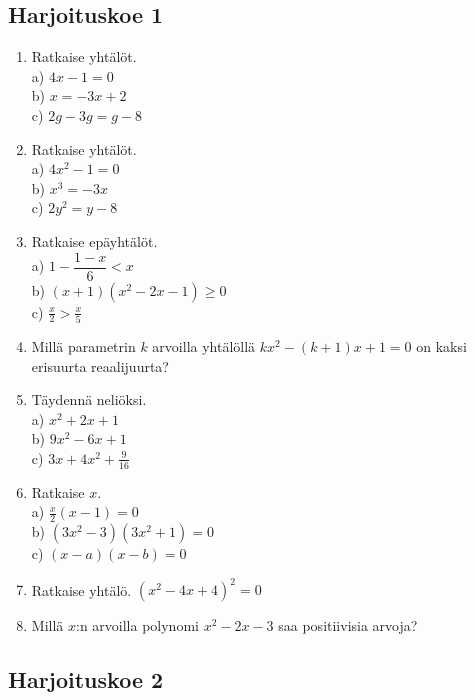 
\subsection*{Harjoituskoe 1}

\begin{enumerate}
\item Ratkaise yhtälöt.\\ a) $4x-1=0$\\ b) $x=-3x+2$\\ c) $2g-3g=g-8$
\item Ratkaise yhtälöt.\\ a) $4x^2-1=0$\\ b) $x^3=-3x$\\ c) $2y^2=y-8$
\item Ratkaise epäyhtälöt.\\ a) $1-\dfrac{1-x}{6}<x$\\ b) $(x+1)(x^2-2x-1)\geq0$\\ c) $\frac{x}{2}>\frac{x}{5}$
\item Millä parametrin $k$ arvoilla yhtälöllä $kx^2-(k+1)x+1=0$ on kaksi erisuurta reaalijuurta?
\item Täydennä neliöksi. \\ a) $x^2+2x+1$\\ b) $9x^2-6x+1$\\ c) $3x+4x^2+\frac{9}{16}$
\item Ratkaise $x$. \\ a) $\frac{x}{2}(x-1)=0$\\ b) $(3x^2-3)(3x^2+1)=0$\\ c) $(x-a)(x-b)=0$
\item Ratkaise yhtälö. $(x^2-4x+4)^2=0$
\item Millä $x$:n arvoilla polynomi $x^2-2x-3$ saa positiivisia arvoja?

\end{enumerate}

\subsection*{Harjoituskoe 2}

